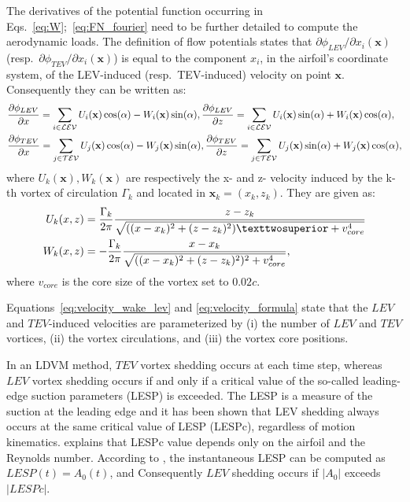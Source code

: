 \documentclass[a4paper,12pt]{article}
\begin{document}
The derivatives of the potential function occurring in Eqs.~\ref{eq:W};~\ref{eq:FN_fourier} need to be further detailed to compute the aerodynamic loads.
The definition of flow potentials states that $\partial \phi_{LEV}/\partial x_i(\textbf{x})$ (resp.~$\partial \phi_{TEV}/\partial x_i(\textbf{x})$) is equal to the component $x_i$, in the airfoil's coordinate system,  of the LEV-induced (resp.~TEV-induced) velocity on point $\textbf{x}$.
Consequently they can be written as:
\begin{align}
  &\frac{\partial \phi_{LEV}}{\partial x}=\sum_{i\in \mathcal{LEV}} U_i(\mathbf{x})\cos(\alpha)- W_i(\mathbf{x})\sin(\alpha),
  \frac{\partial \phi_{LEV}}{\partial z}=\sum_{i\in \mathcal{LEV}} U_i(\mathbf{x})\sin(\alpha)+ W_i(\mathbf{x})\cos(\alpha),\notag\\
  &\frac{\partial \phi_{TEV}}{\partial x}=\sum_{j\in \mathcal{TEV}} U_j(\mathbf{x})\cos(\alpha)- W_j(\mathbf{x})\sin(\alpha),
  \frac{\partial \phi_{TEV}}{\partial z}=\sum_{j\in \mathcal{TEV}} U_j(\mathbf{x})\sin(\alpha)+ W_j(\mathbf{x})\cos(\alpha),
  \label{eq:velocity_wake_lev}
\end{align} 
where $U_k(\textbf{x}),W_k(\textbf{x})$ are respectively the x- and z- velocity induced by the k-th vortex of circulation $\Gamma_k$ and located in $\textbf{x}_k=(x_k,z_k)$. 
They are given as:
\begin{align}
U_k(x,z) &= \frac{\Gamma_k}{2\pi} \frac{z - z_k}{\sqrt{((x - x_k)^2 + (z - z_k)^2)² + v_{core}^4}} \notag\\
W_k(x,z) &= -\frac{\Gamma_k}{2\pi} \frac{x - x_k}{\sqrt{((x - x_k)^2 + (z - z_k)^2)^2 + v_{core}^4}},
\label{eq:velocity_formula}
\end{align}
where $v_{core}$ is the core size of the vortex set to $0.02 c$.

Equations~\ref{eq:velocity_wake_lev} and \ref{eq:velocity_formula} state that the $LEV$ and $TEV$-induced velocities are parameterized by (i) the number of $LEV$ and $TEV$ vortices, (ii) the vortex circulations,  and (iii) the vortex core positions.

In an LDVM method, $TEV$ vortex shedding occurs at each time step, whereas $LEV$ vortex shedding  occurs if and only if a critical value of the so-called leading-edge suction parameters (LESP) is exceeded.
The LESP is a  measure of the suction at the leading edge and it has been shown \citep{ramesh_unsteady_2013,ramesh2011augmentation} that LEV shedding always occurs at the same critical value of LESP (LESPc), regardless of motion kinematics.
\cite{ramesh2014discrete} explains that LESPc value depends only on the airfoil and the Reynolds number.
According to \cite{ramesh2014discrete}, the instantaneous LESP can be computed as $LESP(t)=A_0(t)$, and Consequently $LEV$ shedding  occurs if $|A_0|$ exceeds $|LESPc|$.
\end{document}
